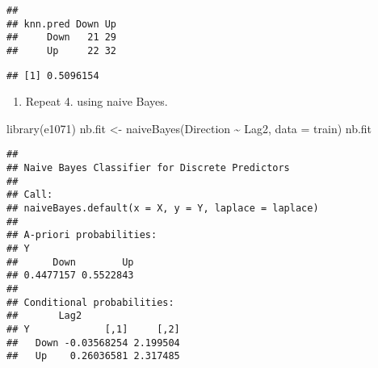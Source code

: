 \documentclass[
]{article}
\newenvironment{Shaded}{\begin{snugshade}}{\end{snugshade}}
\newcommand{\AttributeTok}[1]{\textcolor[rgb]{0.77,0.63,0.00}{#1}}
\newcommand{\DecValTok}[1]{\textcolor[rgb]{0.00,0.00,0.81}{#1}}
\newcommand{\FunctionTok}[1]{\textcolor[rgb]{0.00,0.00,0.00}{#1}}
\newcommand{\NormalTok}[1]{#1}
\newcommand{\OtherTok}[1]{\textcolor[rgb]{0.56,0.35,0.01}{#1}}
\newcommand{\SpecialCharTok}[1]{\textcolor[rgb]{0.00,0.00,0.00}{#1}}
\newcommand{\StringTok}[1]{\textcolor[rgb]{0.31,0.60,0.02}{#1}}
\providecommand{\tightlist}{%
  \setlength{\itemsep}{0pt}\setlength{\parskip}{0pt}}
\begin{document}
\begin{Shaded}
\end{Shaded}

\begin{verbatim}
##         
## knn.pred Down Up
##     Down   21 29
##     Up     22 32
\end{verbatim}

\begin{Shaded}
\end{Shaded}

\begin{verbatim}
## [1] 0.5096154
\end{verbatim}

\begin{enumerate}
\def\labelenumi{\arabic{enumi}.}
\setcounter{enumi}{7}
\tightlist
\item
  Repeat 4. using naive Bayes.
\end{enumerate}

\begin{Shaded}
\begin{Highlighting}[]
\FunctionTok{library}\NormalTok{(e1071)}
\NormalTok{nb.fit }\OtherTok{\textless{}{-}} \FunctionTok{naiveBayes}\NormalTok{(Direction }\SpecialCharTok{\textasciitilde{}}\NormalTok{ Lag2, }\AttributeTok{data =}\NormalTok{ train)}
\NormalTok{nb.fit}
\end{Highlighting}
\end{Shaded}

\begin{verbatim}
## 
## Naive Bayes Classifier for Discrete Predictors
## 
## Call:
## naiveBayes.default(x = X, y = Y, laplace = laplace)
## 
## A-priori probabilities:
## Y
##      Down        Up 
## 0.4477157 0.5522843 
## 
## Conditional probabilities:
##       Lag2
## Y             [,1]     [,2]
##   Down -0.03568254 2.199504
##   Up    0.26036581 2.317485
\end{verbatim}
\end{document}
